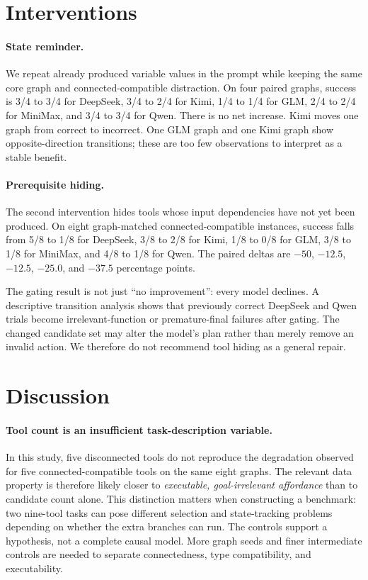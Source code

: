\documentclass[twoside,11pt,preprint]{article}
\begin{document}
\section{Interventions}

\paragraph{State reminder.}
We repeat already produced variable values in the prompt while keeping the same
core graph and connected-compatible distraction. On four paired graphs, success
is 3/4 to 3/4 for DeepSeek, 3/4 to 2/4 for Kimi, 1/4 to 1/4 for GLM, 2/4 to
2/4 for MiniMax, and 3/4 to 3/4 for Qwen. There is no net increase. Kimi moves one graph from correct to
incorrect. One GLM graph and one Kimi graph show opposite-direction transitions;
these are too few observations to interpret as a stable benefit.

\paragraph{Prerequisite hiding.}
The second intervention hides tools whose input dependencies have not yet been
produced. On eight graph-matched connected-compatible instances, success falls
from 5/8 to 1/8 for DeepSeek, 3/8 to 2/8 for Kimi, 1/8 to 0/8 for GLM, 3/8 to
1/8 for MiniMax, and 4/8 to 1/8 for Qwen. The paired deltas are $-50$, $-12.5$,
$-12.5$, $-25.0$, and $-37.5$ percentage points.



The gating result is not just ``no improvement'': every model declines. A
descriptive transition analysis shows that previously correct DeepSeek and Qwen
trials become irrelevant-function or premature-final failures after gating. The
changed candidate set may alter the model's plan rather than merely remove an
invalid action. We therefore do not recommend tool hiding as a general repair.

\section{Discussion}

\paragraph{Tool count is an insufficient task-description variable.}
In this study, five disconnected tools do not reproduce the degradation observed
for five connected-compatible tools on the same eight graphs. The relevant data
property is therefore likely closer to \emph{executable, goal-irrelevant
affordance} than to candidate count alone. This distinction matters when
constructing a benchmark: two nine-tool tasks can pose different selection and
state-tracking problems depending on whether the extra branches can run. The
controls support a hypothesis, not a complete causal model. More graph seeds and
finer intermediate controls are needed to separate connectedness, type
compatibility, and executability.
\end{document}
